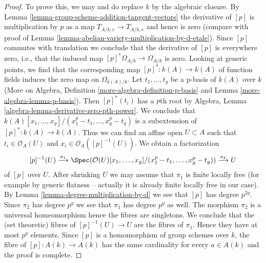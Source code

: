 \begin{proof}
To prove this, we may and do replace $k$ by the algebraic closure.
By Lemma \ref{lemma-group-scheme-addition-tangent-vectors}
the derivative of $[p]$ is multiplication by $p$ as a map
$T_{A/k, e} \to T_{A/k, e}$ and hence is zero (compare
with proof of Lemma \ref{lemma-abelian-variety-multiplication-by-d-etale}).
Since $[p]$ commutes with translation we conclude that the derivative of $[p]$
is everywhere zero, i.e., that the induced map
$[p]^*\Omega_{A/k} \to \Omega_{A/k}$ is zero.
Looking at generic points, we find that
the corresponding map $[p]^* : k(A) \to k(A)$
of function fields induces the zero map on $\Omega_{k(A)/k}$.
Let $t_1, \ldots, t_g$ be a p-basis of $k(A)$ over $k$
(More on Algebra, Definition \ref{more-algebra-definition-p-basis} and
Lemma \ref{more-algebra-lemma-p-basis}). Then $[p]^*(t_i)$
has a $p$th root by
Algebra, Lemma \ref{algebra-lemma-derivative-zero-pth-power}.
We conclude that
$k(A)[x_1, \ldots, x_g]/(x_1^p - t_1, \ldots, x_g^p - t_g)$ is a subextension
of $[p]^* : k(A) \to k(A)$.
Thus we can find an affine open $U \subset A$ such that
$t_i \in \mathcal{O}_A(U)$ and $x_i \in \mathcal{O}_A([p]^{-1}(U))$.
We obtain a factorization
$$
[p]^{-1}(U)
\xrightarrow{\pi_1}
\Spec(\mathcal{O}(U)[x_1, \ldots, x_g]/(x_1^p - t_1, \ldots, x_g^p - t_g))
\xrightarrow{\pi_2}
U
$$
of $[p]$ over $U$. After shrinking $U$ we may assume that $\pi_1$
is finite locally free (for example by generic flatness -- actually it is
already finite locally free in our case).
By Lemma \ref{lemma-degree-multiplication-by-d} we see that
$[p]$ has degree $p^{2g}$. Since $\pi_2$
has degree $p^g$ we see that $\pi_1$ has degree $p^g$ as well.
The morphism $\pi_2$ is a universal homeomorphism hence the fibres are
singletons. We conclude that the (set theoretic) fibres of $[p]^{-1}(U) \to U$
are the fibres of $\pi_1$. Hence they
have at most $p^g$ elements. Since $[p]$ is a homomorphism of group
schemes over $k$, the fibre of $[p] : A(k) \to A(k)$ has the
same cardinality for every $a \in A(k)$ and the proof is complete.
\end{proof}

